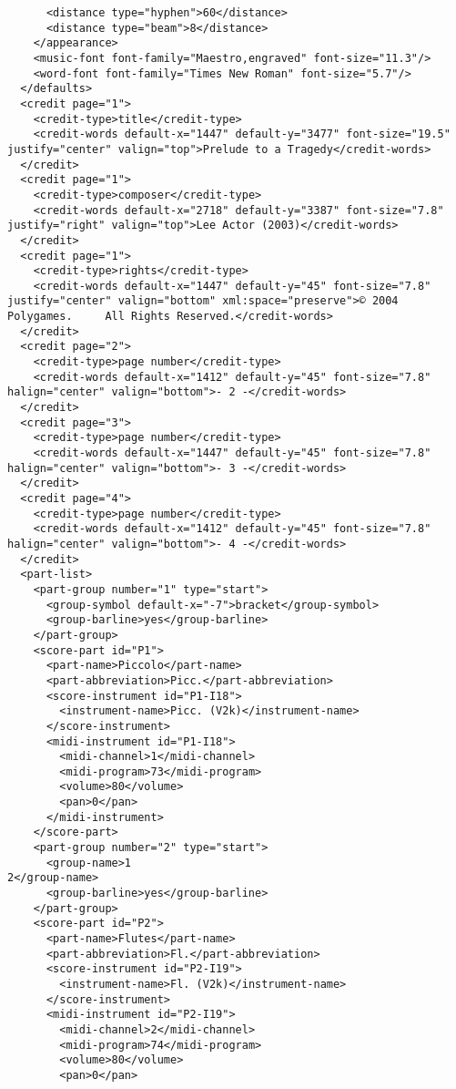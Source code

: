 \documentclass[11pt,english]{article}
\begin{document}
\begin{lstlisting}
      <distance type="hyphen">60</distance>
      <distance type="beam">8</distance>
    </appearance>
    <music-font font-family="Maestro,engraved" font-size="11.3"/>
    <word-font font-family="Times New Roman" font-size="5.7"/>
  </defaults>
  <credit page="1">
    <credit-type>title</credit-type>
    <credit-words default-x="1447" default-y="3477" font-size="19.5" justify="center" valign="top">Prelude to a Tragedy</credit-words>
  </credit>
  <credit page="1">
    <credit-type>composer</credit-type>
    <credit-words default-x="2718" default-y="3387" font-size="7.8" justify="right" valign="top">Lee Actor (2003)</credit-words>
  </credit>
  <credit page="1">
    <credit-type>rights</credit-type>
    <credit-words default-x="1447" default-y="45" font-size="7.8" justify="center" valign="bottom" xml:space="preserve">© 2004 Polygames.     All Rights Reserved.</credit-words>
  </credit>
  <credit page="2">
    <credit-type>page number</credit-type>
    <credit-words default-x="1412" default-y="45" font-size="7.8" halign="center" valign="bottom">- 2 -</credit-words>
  </credit>
  <credit page="3">
    <credit-type>page number</credit-type>
    <credit-words default-x="1447" default-y="45" font-size="7.8" halign="center" valign="bottom">- 3 -</credit-words>
  </credit>
  <credit page="4">
    <credit-type>page number</credit-type>
    <credit-words default-x="1412" default-y="45" font-size="7.8" halign="center" valign="bottom">- 4 -</credit-words>
  </credit>
  <part-list>
    <part-group number="1" type="start">
      <group-symbol default-x="-7">bracket</group-symbol>
      <group-barline>yes</group-barline>
    </part-group>
    <score-part id="P1">
      <part-name>Piccolo</part-name>
      <part-abbreviation>Picc.</part-abbreviation>
      <score-instrument id="P1-I18">
        <instrument-name>Picc. (V2k)</instrument-name>
      </score-instrument>
      <midi-instrument id="P1-I18">
        <midi-channel>1</midi-channel>
        <midi-program>73</midi-program>
        <volume>80</volume>
        <pan>0</pan>
      </midi-instrument>
    </score-part>
    <part-group number="2" type="start">
      <group-name>1
2</group-name>
      <group-barline>yes</group-barline>
    </part-group>
    <score-part id="P2">
      <part-name>Flutes</part-name>
      <part-abbreviation>Fl.</part-abbreviation>
      <score-instrument id="P2-I19">
        <instrument-name>Fl. (V2k)</instrument-name>
      </score-instrument>
      <midi-instrument id="P2-I19">
        <midi-channel>2</midi-channel>
        <midi-program>74</midi-program>
        <volume>80</volume>
        <pan>0</pan>

\end{lstlisting}
\end{document}
